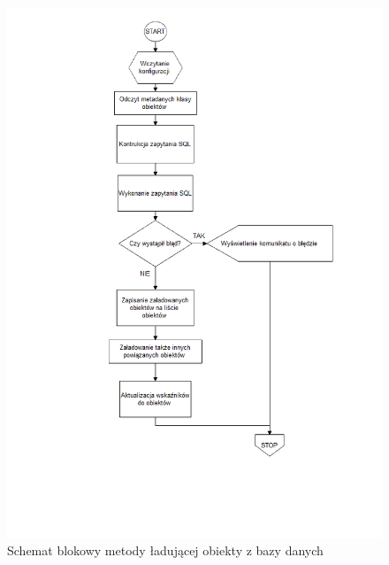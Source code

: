 \documentclass[12pt]{report}
\begin{document}
\begin{figure}[H]
\centering
\includegraphics[width=\textwidth]{resources/load_schema.png}
\caption{Schemat blokowy metody ładującej obiekty z bazy danych}
\end{figure}
\end{document}
